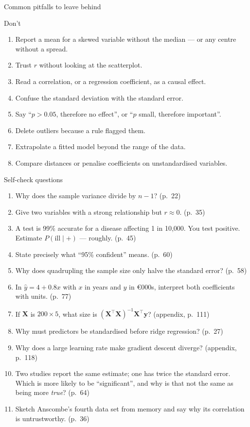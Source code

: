 \documentclass[aspectratio=169,11pt]{beamer}
\begin{document}
\begin{frame}{Common pitfalls to leave behind}
  \begin{alertblock}{Don't}
    \begin{enumerate}
      \item Report a mean for a skewed variable without the median --- or any
            centre without a spread.
      \item Trust $r$ without looking at the scatterplot.
      \item Read a correlation, or a regression coefficient, as a causal
            effect.
      \item Confuse the standard deviation with the standard error.
      \item Say ``$p > 0.05$, therefore no effect'', or ``$p$ small,
            therefore important''.
      \item Delete outliers because a rule flagged them.
      \item Extrapolate a fitted model beyond the range of the data.
      \item Compare distances or penalise coefficients on unstandardised
            variables.
    \end{enumerate}
  \end{alertblock}
\end{frame}

\begin{frame}{Self-check questions}
  \begin{enumerate}
    \item Why does the sample variance divide by $n-1$? (p.~22)
    \item Give two variables with a strong relationship but $r \approx 0$. (p.~35)
    \item A test is 99\% accurate for a disease affecting 1 in 10{,}000.
          You test positive. Estimate $P(\text{ill}\mid+)$ --- roughly. (p.~45)
    \item State precisely what ``95\% confident'' means. (p.~60)
    \item Why does quadrupling the sample size only halve the standard
          error? (p.~58)
    \item In $\hat y = 4 + 0.8x$ with $x$ in years and $y$ in \euro 000s,
          interpret both coefficients with units. (p.~77)
    \item If $\mathbf{X}$ is $200 \times 5$, what size is
          $(\mathbf{X}^\top\mathbf{X})^{-1}\mathbf{X}^\top\mathbf{y}$?
          (appendix, p.~111)
    \item Why must predictors be standardised before ridge regression? (p.~27)
    \item Why does a large learning rate make gradient descent diverge?
          (appendix, p.~118)
    \item Two studies report the same estimate; one has twice the standard
          error. Which is more likely to be ``significant'', and why is that
          not the same as being more \emph{true}? (p.~64)
    \item Sketch Anscombe's fourth data set from memory and say why its
          correlation is untrustworthy. (p.~36)
  \end{enumerate}
\end{frame}
\end{document}
